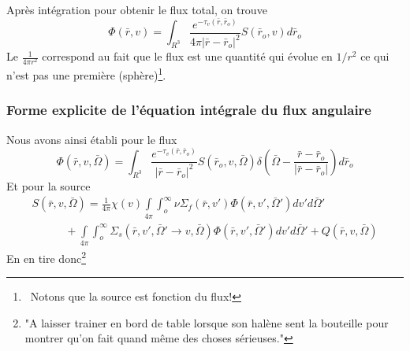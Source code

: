Après intégration pour obtenir le flux total, on trouve
\begin{equation}
\varPhi (\bar r,v) = \int_{{R^3}}^{} {  \frac{{{e^{ - {\tau _v}(\bar r,{{\bar r}_o})}}}}{{4\pi {{\left| {\bar r - {{\bar r}_o}} \right|}^2}}}} S({\bar r_o},v)d{\bar r_o}
\end{equation}
Le $\frac{1}{4\pi r^2}$ correspond au fait que le flux est une quantité qui évolue en $1/r^2$ ce 
qui n'est pas une première (sphère)\footnote{\danger\ Notons que la source est fonction du flux!}.

\subsubsection{Forme explicite de l'équation intégrale du flux angulaire}
Nous avons ainsi établi pour le flux
\begin{equation}
\varPhi (\bar r,v,\bar \Omega ) = \int_{{R^3}}^{} {  \frac{{{e^{ - {\tau _v}(\bar r,{{\bar r}_o})}}}}{{{{\left| {\bar r - {{\bar r}_o}} \right|}^2}}}} S({\bar r_o},v,\bar \Omega )\delta \left( {\bar \Omega  - \frac{{\bar r - {{\bar r}_o}}}{{\left| {\bar r - {{\bar r}_o}} \right|}}} \right)d{\bar r_o}
\end{equation}
Et pour la source
\begin{equation}
\begin{array}{l}
S(\bar r,v,\bar \Omega ) = \frac{1}{{4\pi }}\chi (v)\int\limits_{4\pi }    \int_o^\infty     \nu {\Sigma _f}(\bar r,v')\varPhi (\bar r,v',\bar \Omega ')dv'd\bar \Omega '\\
\quad \quad \quad  + \int\limits_{4\pi }    \int_o^\infty     {\Sigma _s}(\bar r,v',\bar \Omega ' \to v,\bar \Omega )\varPhi (\bar r,v',\bar \Omega ')dv'd\bar \Omega ' + Q(\bar r,v,\bar \Omega )
\end{array}
\end{equation}
En en tire donc\footnote{"A laisser trainer en bord de table lorsque son halène sent la bouteille pour montrer qu'on fait 
quand même des choses sérieuses."}\\

